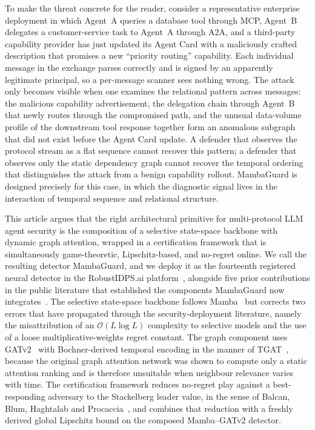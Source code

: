 \documentclass[journal,10pt,twocolumn]{IEEEtran}
\newcommand{\calO}{\mathcal{O}}
\begin{document}
To make the threat concrete for the reader, consider a representative enterprise deployment in which Agent~A queries a database tool through MCP, Agent~B delegates a customer-service task to Agent~A through A2A, and a third-party capability provider has just updated its Agent Card with a maliciously crafted description that promises a new ``priority routing'' capability. Each individual message in the exchange parses correctly and is signed by an apparently legitimate principal, so a per-message scanner sees nothing wrong. The attack only becomes visible when one examines the relational pattern across messages: the malicious capability advertisement, the delegation chain through Agent~B that newly routes through the compromised path, and the unusual data-volume profile of the downstream tool response together form an anomalous subgraph that did not exist before the Agent Card update. A defender that observes the protocol stream as a flat sequence cannot recover this pattern; a defender that observes only the static dependency graph cannot recover the temporal ordering that distinguishes the attack from a benign capability rollout. MambaGuard is designed precisely for this case, in which the diagnostic signal lives in the interaction of temporal sequence and relational structure.

This article argues that the right architectural primitive for multi-protocol LLM agent security is the composition of a selective state-space backbone with dynamic graph attention, wrapped in a certification framework that is simultaneously game-theoretic, Lipschitz-based, and no-regret online. We call the resulting detector MambaGuard, and we deploy it as the fourteenth registered neural detector in the RobustIDPS.ai platform~\cite{Anonymous2026RobustIDPS}, alongside five prior contributions in the public literature that established the components MambaGuard now integrates~\cite{Anonymous2026MambaShield,Anonymous2026HGP,Anonymous2026TANODE,Anonymous2024Adversarial,Anonymous2025SMT,Anonymous2024ElCon}. The selective state-space backbone follows Mamba~\cite{Gu2023Mamba} but corrects two errors that have propagated through the security-deployment literature, namely the misattribution of an $\calO(L\log L)$ complexity to selective models and the use of a loose multiplicative-weights regret constant. The graph component uses GATv2~\cite{Brody2022GATv2} with Bochner-derived temporal encoding in the manner of TGAT~\cite{Xu2020TGAT}, because the original graph attention network was shown to compute only a static attention ranking and is therefore unsuitable when neighbour relevance varies with time. The certification framework reduces no-regret play against a best-responding adversary to the Stackelberg leader value, in the sense of Balcan, Blum, Haghtalab and Procaccia~\cite{Balcan2015Commitment}, and combines that reduction with a freshly derived global Lipschitz bound on the composed Mamba--GATv2 detector.
\end{document}

